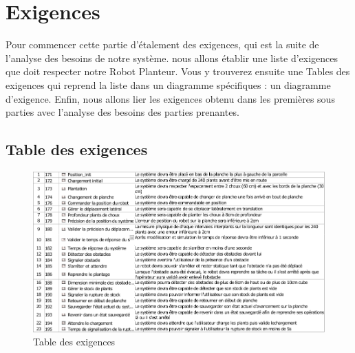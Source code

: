 \chapter{Exigences}
Pour commencer cette partie d'étalement des exigences, qui est la suite de l'analyse des besoins de notre système. nous allons établir une liste d'exigences que doit respecter notre Robot Planteur. Vous y trouverez ensuite une Tables des exigences qui reprend la liste dans un diagramme spécifiques : un diagramme d'exigence. Enfin, nous allons lier les exigences obtenu dans les premières sous parties avec l'analyse des besoins des parties prenantes.

\section{Table des exigences}
\begin{figure}[!ht]
\centering
\includegraphics[width = .8\textwidth]{./II/images/SysML_Requirements_Table__Specifications_MOE__Specifications.pdf}
\caption{Table des exigences}\label{fig:requirementsTable}
\end{figure}


